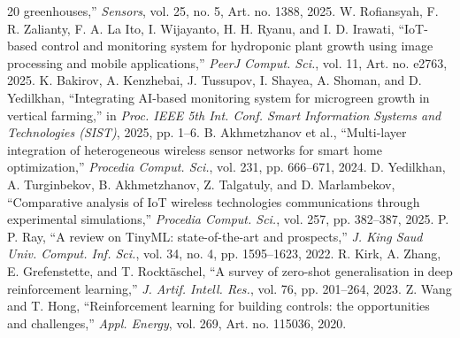 \documentclass[conference]{IEEEtran}
\begin{document}
\begin{thebibliography}{20}
greenhouses,'' \emph{Sensors}, vol. 25, no. 5, Art. no. 1388, 2025.
 W. Rofiansyah, F. R. Zalianty, F. A. La Ito, I. Wijayanto,
H. H. Ryanu, and I. D. Irawati, ``IoT-based control and monitoring system for
hydroponic plant growth using image processing and mobile applications,''
\emph{PeerJ Comput. Sci.}, vol. 11, Art. no. e2763, 2025.
 K. Bakirov, A. Kenzhebai, J. Tussupov, I. Shayea, A. Shoman,
and D. Yedilkhan, ``Integrating AI-based monitoring system for microgreen growth
in vertical farming,'' in \emph{Proc. IEEE 5th Int. Conf. Smart Information
Systems and Technologies (SIST)}, 2025, pp. 1--6.
 B. Akhmetzhanov et al., ``Multi-layer integration of
heterogeneous wireless sensor networks for smart home optimization,'' \emph{Procedia
Comput. Sci.}, vol. 231, pp. 666--671, 2024.
 D. Yedilkhan, A. Turginbekov, B. Akhmetzhanov, Z. Talgatuly,
and D. Marlambekov, ``Comparative analysis of IoT wireless technologies
communications through experimental simulations,'' \emph{Procedia Comput. Sci.},
vol. 257, pp. 382--387, 2025.
 P. P. Ray, ``A review on TinyML: state-of-the-art and prospects,''
\emph{J. King Saud Univ. Comput. Inf. Sci.}, vol. 34, no. 4, pp. 1595--1623, 2022.
 R. Kirk, A. Zhang, E. Grefenstette, and T. Rockt\"aschel,
``A survey of zero-shot generalisation in deep reinforcement learning,''
\emph{J. Artif. Intell. Res.}, vol. 76, pp. 201--264, 2023.
 Z. Wang and T. Hong, ``Reinforcement learning for building
controls: the opportunities and challenges,'' \emph{Appl. Energy}, vol. 269,
Art. no. 115036, 2020.
\end{thebibliography}
\end{document}
